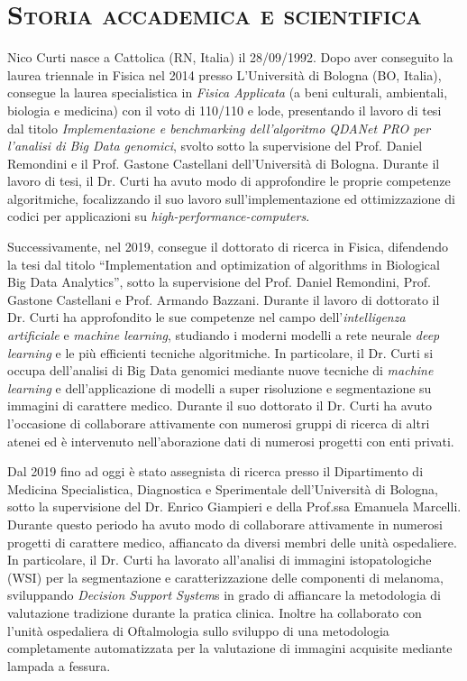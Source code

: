 \documentclass[a4paper,11pt]{article}
\newcommand{\quotes}[1]{``#1''}
\begin{document}
\maketitle

\section*{\scshape{Storia accademica e scientifica}}

Nico Curti nasce a Cattolica (RN, Italia) il 28/09/1992.
Dopo aver conseguito la laurea triennale in Fisica nel 2014 presso L'Università di Bologna (BO, Italia), consegue la laurea specialistica in \emph{Fisica Applicata} (a beni culturali, ambientali, biologia e medicina) con il voto di 110/110 e lode, presentando il lavoro di tesi dal titolo \emph{Implementazione e benchmarking dell'algoritmo QDANet PRO per l'analisi di Big Data genomici}, svolto sotto la supervisione del Prof. Daniel Remondini e il Prof. Gastone Castellani dell'Università di Bologna.
Durante il lavoro di tesi, il Dr. Curti ha avuto modo di approfondire le proprie competenze algoritmiche, focalizzando il suo lavoro sull'implementazione ed ottimizzazione di codici per applicazioni su \emph{high-performance-computers}.

Successivamente, nel 2019, consegue il dottorato di ricerca in Fisica, difendendo la tesi dal titolo \quotes{Implementation and optimization of algorithms in Biological Big Data Analytics}, sotto la supervisione del Prof. Daniel Remondini, Prof. Gastone Castellani e Prof. Armando Bazzani.
Durante il lavoro di dottorato il Dr. Curti ha approfondito le sue competenze nel campo dell'\emph{intelligenza artificiale} e \emph{machine learning}, studiando i moderni modelli a rete neurale \emph{deep learning} e le più efficienti tecniche algoritmiche.
In particolare, il Dr. Curti si occupa dell'analisi di Big Data genomici mediante nuove tecniche di \emph{machine learning} e dell'applicazione di modelli a super risoluzione e segmentazione su immagini di carattere medico.
Durante il suo dottorato il Dr. Curti ha avuto l'occasione di collaborare attivamente con numerosi gruppi di ricerca di altri atenei ed è intervenuto nell'aborazione dati di numerosi progetti con enti privati.

Dal 2019 fino ad oggi è stato assegnista di ricerca presso il Dipartimento di Medicina Specialistica, Diagnostica e Sperimentale dell'Università di Bologna, sotto la supervisione del Dr. Enrico Giampieri e della Prof.ssa Emanuela Marcelli.
Durante questo periodo ha avuto modo di collaborare attivamente in numerosi progetti di carattere medico, affiancato da diversi membri delle unità ospedaliere.
In particolare, il Dr. Curti ha lavorato all'analisi di immagini istopatologiche (WSI) per la segmentazione e caratterizzazione delle componenti di melanoma, sviluppando \emph{Decision Support System}s in grado di affiancare la metodologia di valutazione tradizione durante la pratica clinica.
Inoltre ha collaborato con l'unità ospedaliera di Oftalmologia sullo sviluppo di una metodologia completamente automatizzata per la valutazione di immagini acquisite mediante lampada a fessura.
\end{document}
